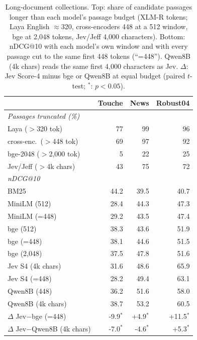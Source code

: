 \begin{table}[t]
\centering
\small
\setlength{\tabcolsep}{3pt}
\caption{Long-document collections. Top: share of candidate passages longer than each model's passage budget (XLM-R tokens; Laya English $\approx$320, cross-encoders 448 at a 512 window, bge at 2{,}048 tokens, Jev/Jeff 4{,}000 characters). Bottom: nDCG@10 with each model's own window and with every passage cut to the same first 448 tokens (``=448''). Qwen8B (4k chars) reads the same first 4{,}000 characters as Jev. $\Delta$: Jev Score-4 minus bge or Qwen8B at equal budget (paired $t$-test; $^{*}$: $p<0.05$).}
\label{tab:longdoc}
\begin{tabular}{lrrr}
\toprule
 & Touche & News & Robust04 \\
\midrule
\multicolumn{4}{l}{\textit{Passages truncated (\%)}} \\
\quad Laya ($>$320 tok) & 77 & 99 & 96 \\
\quad cross-enc.\ ($>$448 tok) & 69 & 97 & 92 \\
\quad bge-2048 ($>$2{,}000 tok) & 5 & 22 & 25 \\
\quad Jev/Jeff ($>$4k chars) & 43 & 75 & 72 \\
\midrule
\multicolumn{4}{l}{\textit{nDCG@10}} \\
\quad BM25 & 44.2 & 39.5 & 40.7 \\
\quad MiniLM (512) & 28.4 & 44.3 & 47.3 \\
\quad MiniLM (=448) & 29.2 & 43.5 & 47.4 \\
\quad bge (512) & 38.3 & 43.6 & 51.9 \\
\quad bge (=448) & 38.1 & 44.6 & 51.5 \\
\quad bge (2{,}048) & 37.5 & 47.8 & 51.6 \\
\quad Jev S4 (4k chars) & 31.6 & 48.6 & 65.9 \\
\quad Jev S4 (=448) & 28.2 & 49.4 & 63.1 \\
\quad Qwen8B (448) & 36.2 & 51.6 & 58.0 \\
\quad Qwen8B (4k chars) & 38.7 & 53.2 & 60.5 \\
\midrule
$\Delta$ Jev$-$bge (=448) & -9.9$^{*}$ & +4.9$^{*}$ & +11.5$^{*}$ \\
$\Delta$ Jev$-$Qwen8B (4k chars) & -7.0$^{*}$ & -4.6$^{*}$ & +5.3$^{*}$ \\
\bottomrule
\end{tabular}
\end{table}